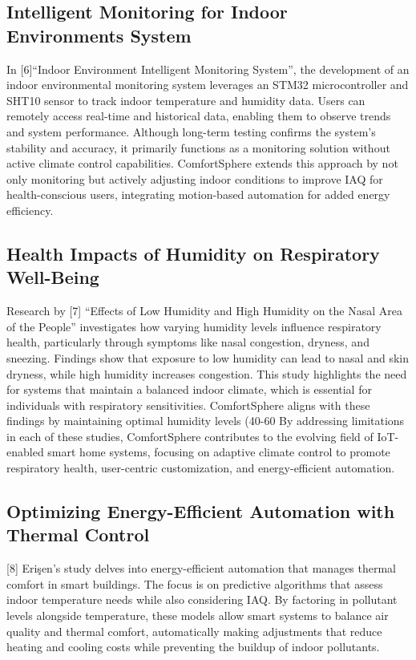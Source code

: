 \documentclass[a4paper]{scrartcl}
\begin{document}
\subsection{Intelligent Monitoring for Indoor Environments System}
In [6]“Indoor Environment Intelligent Monitoring System”, the development of an indoor environmental monitoring system leverages an STM32 microcontroller and SHT10 sensor to track indoor temperature and humidity data. Users can remotely access real-time and historical data, enabling them to observe trends and system performance. Although long-term testing confirms the system’s stability and accuracy, it primarily functions as a monitoring solution without active climate control capabilities. ComfortSphere extends this approach by not only monitoring but actively adjusting indoor conditions to improve IAQ for health-conscious users, integrating motion-based automation for added energy efficiency.

\subsection{ Health Impacts of Humidity on Respiratory Well-Being}
Research by [7] “Effects of Low Humidity and High Humidity on the Nasal Area of the People” investigates how varying humidity levels influence respiratory health, particularly through symptoms like nasal congestion, dryness, and sneezing. Findings show that exposure to low humidity can lead to nasal and skin dryness, while high humidity increases congestion. This study highlights the need for systems that maintain a balanced indoor climate, which is essential for individuals with respiratory sensitivities. ComfortSphere aligns with these findings by maintaining optimal humidity levels (40-60%
By addressing limitations in each of these studies, ComfortSphere contributes to the evolving field of IoT-enabled smart home systems, focusing on adaptive climate control to promote respiratory health, user-centric customization, and energy-efficient automation.

\subsection{Optimizing Energy-Efficient Automation with Thermal Control}
[8] Erişen’s study delves into energy-efficient automation that manages thermal comfort in smart buildings. The focus is on predictive algorithms that assess indoor temperature needs while also considering IAQ. By factoring in pollutant levels alongside temperature, these models allow smart systems to balance air quality and thermal comfort, automatically making adjustments that reduce heating and cooling costs while preventing the buildup of indoor pollutants.\\
\end{document}
